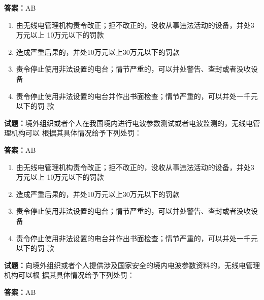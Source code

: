 \documentclass{ctexbook}
\begin{document}
\textbf{答案：}AB 

\begin{enumerate}[leftmargin=3em]
  \item 由无线电管理机构责令改正；拒不改正的，没收从事违法活动的设备，并处3万元以上
10万元以下的罚款 

  \item 造成严重后果的，并处10万元以上30万元以下的罚款 

  \item 责令停止使用非法设置的电台；情节严重的，可以并处警告、查封或者没收设备 

  \item 责令停止使用非法设置的电台并作出书面检查；情节严重的，可以并处一千元以下的罚
款 

\end{enumerate}





\vspace{1em}

\textbf{试题：}境外组织或者个人在我国境内进行电波参数测试或者电波监测的，无线电管理机构可以
根据其具体情况给予下列处罚： 

\textbf{答案：}AB 

\begin{enumerate}[leftmargin=3em]
  \item 由无线电管理机构责令改正；拒不改正的，没收从事违法活动的设备，并处3万元以上
10万元以下的罚款 

  \item 造成严重后果的，并处10万元以上30万元以下的罚款 

  \item 责令停止使用非法设置的电台；情节严重的，可以并处警告、查封或者没收设备 

  \item 责令停止使用非法设置的电台并作出书面检查；情节严重的，可以并处一千元以下的罚
款 

\end{enumerate}





\vspace{1em}

\textbf{试题：}向境外组织或者个人提供涉及国家安全的境内电波参数资料的，无线电管理机构可以根
据其具体情况给予下列处罚： 

\textbf{答案：}AB 
\end{document}
